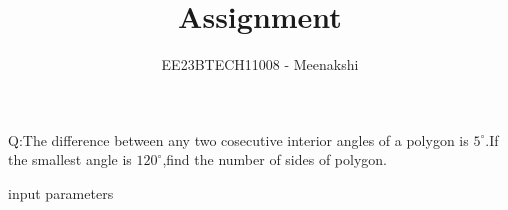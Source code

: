 \documentclass[journal,12pt,twocolumn]{IEEEtran}
\theoremstyle{remark}
\begin{document}
\let\vec\mathbf



\vspace{3cm}
\title{Assignment}
\author{EE23BTECH11008 - Meenakshi}
\maketitle
\newpage
\bigskip

\renewcommand{\thefigure}{\theenumi}
\renewcommand{\thetable}{\theenumi}
Q:The difference between any two cosecutive interior angles of a polygon is $5^\circ$.If the smallest angle is $120^\circ$,find the number of sides of polygon.
\\\solution
 \begin{table}[!ht]
    \centering
        
    \caption{input parameters}
    \label{tab:11_9_2_1}
\end{table}
\end{document}
